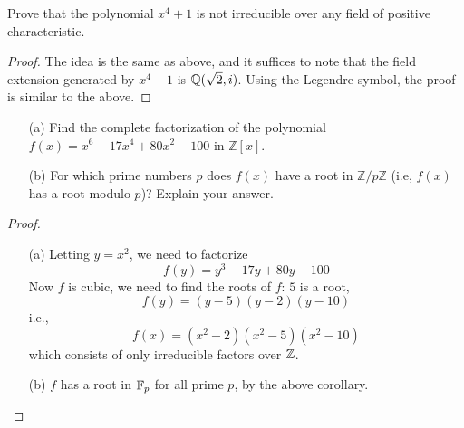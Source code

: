 \begin{prob}[S2015-Q4]
    Prove that the polynomial \(x^{4}+1\) is not irreducible over any field of positive characteristic.
\end{prob}
\begin{proof}
    The idea is the same as above, and it suffices to note that the field extension generated by $x^4+1$ is $\mathbb{Q}(\sqrt{2}, i)$. Using the Legendre symbol, the proof is similar to the above.
\end{proof}



\begin{prob}[F2010-Q2]
    \phantom{text}
    \begin{itemize}
        \item[(a)] Find the complete factorization of the polynomial \(f(x) = x^6 - 17x^4 + 80x^2 - 100\) in \(\mathbb{Z}[x]\).
        \item[(b)] For which prime numbers \(p\) does \(f(x)\) have a root in \(\mathbb{Z}/p\mathbb{Z}\) (i.e, \(f(x)\) has a root modulo \(p\))? Explain your answer.
    \end{itemize}
\end{prob}
\begin{proof}
    \begin{itemize}
        \item[(a)] Letting $y=x^2$, we need to factorize 
        \begin{equation*}
            f(y)=y^3-17y+80y-100
        \end{equation*}
        Now $f$ is cubic, we need to find the roots of $f$: $5$ is a root, 
        \begin{equation*}
            f(y)=(y-5)(y-2)(y-10)
        \end{equation*}
        i.e., 
        \begin{equation*}
            f(x)=(x^2-2)(x^2-5)(x^2-10)
        \end{equation*}
        which consists of only irreducible factors over $\mathbb{Z}$.
        \item[(b)] $f$ has a root in $\mathbb{F}_p$ for all prime $p$, by the above corollary.
    \end{itemize}
\end{proof}

